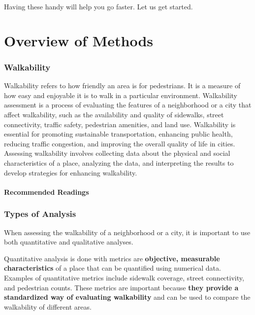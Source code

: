 \documentclass[
]{latex/krantz}
\begin{document}
Having these handy will help you go faster. Let us get started.

\hypertarget{part-overview-of-methods}{%
\part{Overview of Methods}\label{part-overview-of-methods}}

\hypertarget{walkability}{%
\section{Walkability}\label{walkability}}

Walkability refers to how friendly an area is for pedestrians. It is a measure of how easy and enjoyable it is to walk in a particular environment. Walkability assessment is a process of evaluating the features of a neighborhood or a city that affect walkability, such as the availability and quality of sidewalks, street connectivity, traffic safety, pedestrian amenities, and land use. Walkability is essential for promoting sustainable transportation, enhancing public health, reducing traffic congestion, and improving the overall quality of life in cities. Assessing walkability involves collecting data about the physical and social characteristics of a place, analyzing the data, and interpreting the results to develop strategies for enhancing walkability.

\hypertarget{recommended-readings}{%
\subsection{Recommended Readings}\label{recommended-readings}}

\hypertarget{types-of-analysis}{%
\section{Types of Analysis}\label{types-of-analysis}}

When assessing the walkability of a neighborhood or a city, it is important to use both quantitative and qualitative analyses.

Quantitative analysis is done with metrics are \textbf{objective, measurable characteristics} of a place that can be quantified using numerical data. Examples of quantitative metrics include sidewalk coverage, street connectivity, and pedestrian counts. These metrics are important because \textbf{they provide a standardized way of evaluating walkability} and can be used to compare the walkability of different areas.
\end{document}
